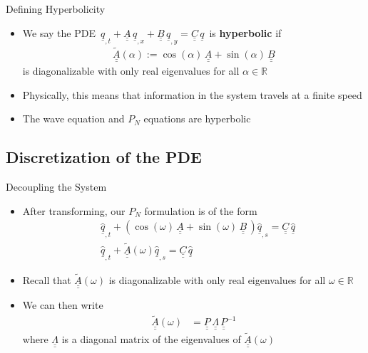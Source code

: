 \documentclass{beamer}
\newcommand{\bunderline}[1]{\underline{#1}}
\renewcommand{\vec}[1]{{\bunderline{#1}}}
\newcommand{\mat}[1]{{\bunderline{\bunderline{#1}}}}
\begin{document}
\begin{frame}{Defining Hyperbolicity}
	
    \begin{itemize}
    	\item We say the PDE $\, \vec{q}_{, t} + \mat{A} \, \vec{q}_{, x} + \mat{B} \, \vec{q}_{, y} = \mat{C} \, \vec{q} \,$ is \textbf{hyperbolic} if
    	\begin{align*}
    	\widetilde{\mat{A}}(\alpha) := \cos (\alpha) \, \mat{A} + \sin (\alpha) \, \mat{B}
    	\end{align*}
    	is diagonalizable with only real eigenvalues for all $\alpha \in \mathbb{R}$
    	\item Physically, this means that information in the system travels at a finite speed
	    \item The wave equation and $P_N$ equations are hyperbolic

    \end{itemize}
\end{frame}
\subsection{Discretization of the PDE}

\begin{frame}{Decoupling the System}
    \begin{itemize}
    	\item After transforming, our $P_N$ formulation is of the form
   		\begin{align*}
    		&\vec{\widehat{q}}_{,t} + \left( \cos (\omega) \, \mat{A} + \sin (\omega) \, \mat{B} \, \right) \vec{\widehat{q}}_{,s} = \mat{C}\,\vec{\widehat{q}} \\
    		&\vec{\widehat{q}}_{,t} + \widetilde{\mat{A}}(\omega) \vec{\widehat{q}}_{,s} = \mat{C}\,\vec{\widehat{q}}
    	\end{align*}
    	\item 
	    	Recall that $\widetilde{\mat{A}} (\omega)$ is diagonalizable with only real eigenvalues for all $\omega \in \mathbb{R}$
        \item We can then write
        \begin{align*}
            \widetilde{\mat{A}}(\omega) & = \mat{P} \, \mat{\Lambda} \, \mat{P}^{-1}
        \end{align*}
        where $\mat{\Lambda}$ is a diagonal matrix of the eigenvalues of $\widetilde{\mat{A}}(\omega)$
    \end{itemize}
\end{frame}
\end{document}
